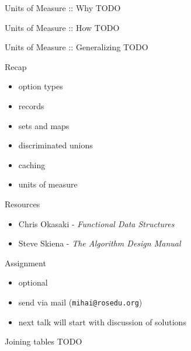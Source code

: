 \documentclass{beamer}
\begin{document}
\begin{frame}{Units of Measure :: Why}
  TODO
\end{frame}

\begin{frame}{Units of Measure :: How}
  TODO
\end{frame}

\begin{frame}{Units of Measure :: Generalizing}
  TODO
\end{frame}

\begin{frame}{Recap}
  \begin{itemize}[<+->]
    \item option types
    \item records
    \item sets and maps
    \item discriminated unions
    \item caching
    \item units of measure
  \end{itemize}
\end{frame}

\begin{frame}{Resources}
  \begin{itemize}
    \item Chris Okasaki - \textit{Functional Data Structures}
    \item Steve Skiena - \textit{The Algorithm Design Manual}
  \end{itemize}
\end{frame}

\begin{frame}[fragile]{Assignment}
  \begin{itemize}
    \item optional
    \item send via mail (\texttt{mihai@rosedu.org})
    \item next talk will start with discussion of solutions
  \end{itemize}
  \pause
  \begin{block}{Joining tables}
  TODO
  \end{block}
\end{frame}
\end{document}
